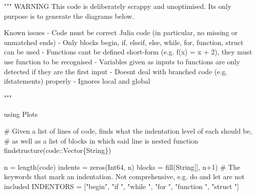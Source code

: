 \documentclass[
  letterpaper,
  DIV=11,
  numbers=noendperiod]{scrreprt}
\newenvironment{Shaded}{\begin{snugshade}}{\end{snugshade}}
\newcommand{\BuiltInTok}[1]{\textcolor[rgb]{0.00,0.23,0.31}{#1}}
\newcommand{\CommentTok}[1]{\textcolor[rgb]{0.37,0.37,0.37}{#1}}
\newcommand{\DataTypeTok}[1]{\textcolor[rgb]{0.68,0.00,0.00}{#1}}
\newcommand{\FloatTok}[1]{\textcolor[rgb]{0.68,0.00,0.00}{#1}}
\newcommand{\FunctionTok}[1]{\textcolor[rgb]{0.28,0.35,0.67}{#1}}
\newcommand{\ImportTok}[1]{\textcolor[rgb]{0.00,0.46,0.62}{#1}}
\newcommand{\KeywordTok}[1]{\textcolor[rgb]{0.00,0.23,0.31}{#1}}
\newcommand{\NormalTok}[1]{\textcolor[rgb]{0.00,0.23,0.31}{#1}}
\newcommand{\OperatorTok}[1]{\textcolor[rgb]{0.37,0.37,0.37}{#1}}
\newcommand{\StringTok}[1]{\textcolor[rgb]{0.13,0.47,0.30}{#1}}
\begin{document}
\begin{Shaded}
\begin{Highlighting}[]
\StringTok{"""}
\StringTok{WARNING}
\StringTok{This code is deliberately scrappy and unoptimised.}
\StringTok{Its only purpose is to generate the diagrams below.}

\StringTok{Known issues}
\StringTok{{-} Code must be correct Julia code (in particular, no missing or unmatched \textasciigrave{}end\textasciigrave{}s)}
\StringTok{{-} Only blocks \textasciigrave{}begin\textasciigrave{}, \textasciigrave{}if\textasciigrave{}, \textasciigrave{}elseif\textasciigrave{}, \textasciigrave{}else\textasciigrave{}, \textasciigrave{}while\textasciigrave{}, \textasciigrave{}for\textasciigrave{}, \textasciigrave{}function\textasciigrave{}, \textasciigrave{}struct\textasciigrave{} can be used}
\StringTok{{-} Functions can\textquotesingle{}t be defined short{-}form (e.g. \textasciigrave{}f(x) = x + 2\textasciigrave{}), they must use \textasciigrave{}function\textasciigrave{} to be recognised}
\StringTok{{-} Variables given as inputs to functions are only detected if they are the first input}
\StringTok{{-} Doesn\textquotesingle{}t deal with branched code (e.g. \textasciigrave{}if\textasciigrave{}{-}statements) properly}
\StringTok{{-} Ignores \textasciigrave{}local\textasciigrave{} and \textasciigrave{}global\textasciigrave{}}

\StringTok{"""}

\ImportTok{using} \BuiltInTok{Plots}

\CommentTok{\# Given a list of lines of code, finds what the indentation level of each should be,}
\CommentTok{\# as well as a list of blocks in which said line is nested}
\KeywordTok{function} \FunctionTok{findstructure}\NormalTok{(code}\OperatorTok{::}\DataTypeTok{Vector\{String\}}\NormalTok{)}
    
\NormalTok{    n }\OperatorTok{=} \FunctionTok{length}\NormalTok{(code)}
\NormalTok{    indents }\OperatorTok{=} \FunctionTok{zeros}\NormalTok{(}\DataTypeTok{Int64}\NormalTok{, n)}
\NormalTok{    blocks }\OperatorTok{=} \FunctionTok{fill}\NormalTok{(}\DataTypeTok{String}\NormalTok{[], n}\OperatorTok{+}\FloatTok{1}\NormalTok{)}
    \CommentTok{\# The keywords that mark an indentation. Not comprehensive, e.g. do and let are not included}
\NormalTok{    INDENTORS }\OperatorTok{=}\NormalTok{ [}\StringTok{"begin"}\NormalTok{, }\StringTok{"if "}\NormalTok{, }\StringTok{"while "}\NormalTok{, }\StringTok{"for "}\NormalTok{, }\StringTok{"function "}\NormalTok{, }\StringTok{"struct "}\NormalTok{]}


\end{Highlighting}
\end{Shaded}
\end{document}
